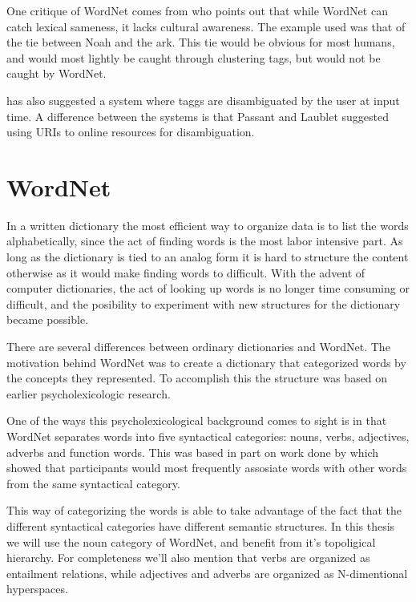 One critique of WordNet comes from \citet{Mika2005} who points out that while WordNet can catch lexical sameness, it lacks cultural awareness. The example used was that of the tie between Noah and the ark.
This tie would be obvious for most humans, and would most lightly be caught through clustering tags, but would not be caught by WordNet.

\citet{Passant2008} has also suggested a system where taggs are disambiguated by the user at input time. A difference between the systems is that Passant and Laublet suggested using URIs to online resources for disambiguation.

\section{WordNet}
In a written dictionary the most efficient way to organize data is to list the words alphabetically, 
since the act of finding words is the most labor intensive part.
As long as the dictionary is tied to an analog form it is hard to structure the content otherwise as it would make
finding words to difficult. 
With the advent of computer dictionaries, the act of looking up words is no longer time consuming or difficult, 
and the posibility to experiment with new structures for the dictionary became possible.

There are several differences between ordinary dictionaries and WordNet. 
The motivation behind WordNet was to create a dictionary that categorized words by the concepts they represented.
To accomplish this the structure was based on earlier psycholexicologic research\citep{Miller1990}.
 
One of the ways this psycholexicological background comes to sight is in that WordNet separates words into five syntactical categories: nouns, verbs, adjectives, adverbs and function words.
This was based in part on work done by \citet{Fillenbaum1965} which showed that participants would most frequently 
assosiate words with other words from the same syntactical category.

This way of categorizing the words is able to take advantage of the fact that the different syntactical categories have different semantic structures.
In this thesis we will use the noun category of WordNet, and benefit from it's topoligical hierarchy.
For completeness we'll also mention that verbs are organized as entailment relations, 
while adjectives and adverbs are organized as N-dimentional hyperspaces\citep{Miller1990}.

